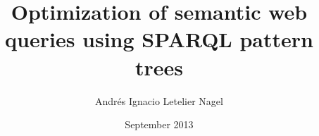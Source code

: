 \documentclass[12pt,reqno,oneside]{pucthesis}
\begin{document}

\title[Optimization of semantic web queries]{Optimization of semantic
  web queries using SPARQL pattern trees}

\author{Andr\'es Ignacio Letelier Nagel}
%
\address{Escuela de Ingenier\'ia\\
         Pontificia Universidad Cat\'olica de Chile\\
         Vicu\~na Mackenna 4860\\
         Santiago, Chile\\
         {\it Tel.\/} : 56 (2) 354-2000}
%
\department   {}
\subject      {Engineering}
\date         {September 2013}

\dedication   {
To Andrés Letelier, for putting this template on github
}


\NoChapterPageNumber           %
\maketitle


\end{document}
